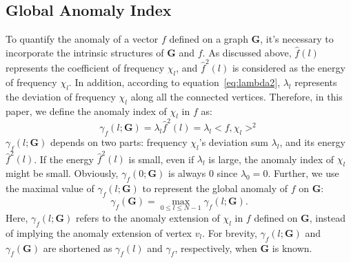 \subsection{Global Anomaly Index}
\label{sec:signal_anomaly_on_Graph}

To quantify the anomaly of a vector $f$ defined on a graph $\mathbf{G}$, it's necessary to incorporate the intrinsic structures of $\mathbf{G}$ and $f$. As discussed above, $\hat{f}(l)$ represents the coefficient of frequency $\chi_l$, and $\hat{f}^2(l)$ is considered as the energy of frequency $\chi_l$. In addition, according to equation~\ref{eq:lambda2}, $\lambda_l$ represents the deviation of frequency $\chi_l$ along all the connected vertices. Therefore, in this paper, we define the anomaly index of $\chi_l$ in $f$ as:
\begin{equation}
\label{eq:lambda3}
\gamma_f(l;\mathbf{G})=\lambda_l\hat{f}^2(l)= \lambda_l<f,\chi_l>^2
\end{equation}
$\gamma_f(l;\mathbf{G})$ depends on two parts: frequency $\chi_l$'s deviation sum $\lambda_l$, and its energy $\hat{f}^2(l)$. If the energy $\hat{f}^2(l)$ is small, even if $\lambda_l$ is large, the anomaly index of $\chi_l$ might be small. Obviously, $\gamma_f(0;\mathbf{G})$ is always $0$ since $\lambda_0=0$. Further, we use the maximal value of $\gamma_f(l;\mathbf{G})$ to represent the global anomaly of $f$ on $\mathbf{G}$:
\begin{equation}
\label{eq:lambda4}
\gamma_f(\mathbf{G})=\underset{0 \leq l \leq N-1}{\max}{\gamma_f(l;\mathbf{G})}.
\end{equation}
Here, $\gamma_f(l;\mathbf{G})$ refers to the anomaly extension of $\chi_l$ in $f$ defined on $\mathbf{G}$, instead of implying the anomaly extension of vertex $v_l$.
For brevity, $\gamma_f(l;\mathbf{G})$  and $\gamma_f(\mathbf{G})$ are shortened as $\gamma_f(l)$ and $\gamma_f$, respectively, when $\mathbf{G}$ is known.

